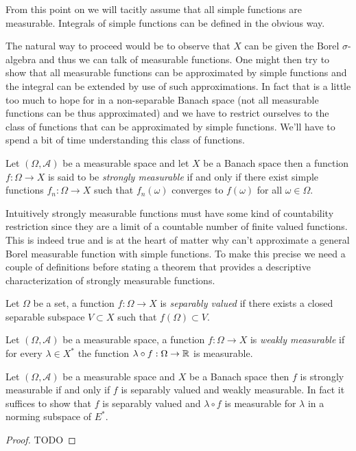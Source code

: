 From this point on we will tacitly assume that all simple functions
are measurable. Integrals of simple functions can be defined in the obvious way.

The natural way to proceed would be to observe that $X$ can be given
the Borel $\sigma$-algebra and thus we can talk of measurable
functions.  One might then try to show that all measurable functions
can be approximated by simple functions and the integral can be
extended by use of such approximations.  In fact that is a little too much to hope for in a
non-separable Banach space (not all measurable functions can be thus
approximated) 
and we have to restrict ourselves to the class of functions that can be approximated
by simple functions.  We'll have to spend a bit of time understanding
this class of functions. 

\begin{defn}Let $(\Omega,\mathcal{A})$ be a measurable space and let
  $X$ be a Banach space then a function $f : \Omega \to X$ is said to
  be \emph{strongly measurable} if and only if there exist simple
  functions $f_n : \Omega \to X$ such that $f_n(\omega)$ converges to 
$f(\omega)$ for  all $\omega \in \Omega$.
\end{defn}

Intuitively strongly measurable functions must have some kind of
countability restriction since they are a limit of a countable number
of finite valued functions.  This is indeed true and is at the heart
of matter why can't approximate a general Borel measurable function
with simple functions.  To make this precise we need a couple of
definitions before stating a theorem that provides a descriptive
characterization of strongly measurable functions.

\begin{defn}Let $\Omega$ be a set, a function $f : \Omega \to X$ is
  \emph{separably valued} if there exists a closed separable subspace $V
  \subset X$ such that $f(\Omega) \subset V$.  
\end{defn}

\begin{defn}Let $(\Omega, \mathcal{A})$ be a measurable space, a function $f : \Omega \to X$ is
  \emph{weakly measurable} if for every $\lambda \in X^*$ the function
  $\lambda \circ f : \Omega \to \mathbb{R}$ is measurable. 
\end{defn}

\begin{thm}Let $(\Omega, \mathcal{A})$ be a measurable space and $X$
  be a Banach space then $f$ is strongly measurable if and only if $f$
  is separably valued and weakly measurable.  In fact it suffices to
  show that $f$ is separably valued and $\lambda \circ f$ is
  measurable for $\lambda$ in a norming subspace of $E^*$.
\end{thm}
\begin{proof}
TODO
\end{proof}

